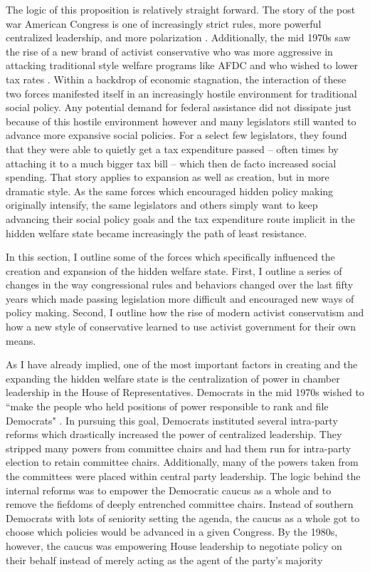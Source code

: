 \documentclass[12pt]{article}
\begin{document}
The logic of this proposition is relatively straight forward. The story of the post war American Congress is one of increasingly strict rules, more powerful centralized leadership, and more polarization \citep{rohde1991, binder2003}. Additionally, the mid 1970s saw the rise of a new brand of activist conservative who was more aggressive in attacking traditional style welfare programs like AFDC and who wished to lower tax rates \citep{hacker2007}. Within a backdrop of economic stagnation, the interaction of these two forces manifested itself in an increasingly hostile environment for traditional social policy. Any potential demand for federal assistance did not dissipate just because of this hostile environment however and many legislators still wanted to advance more expansive social policies. For a select few legislators, they found that they were able to quietly get a tax expenditure passed -- often times by attaching it to a much bigger tax bill -- which then de facto increased social spending. That story applies to expansion as well as creation, but in more dramatic style. As the same forces which encouraged hidden policy making originally intensify, the same legislators and others simply want to keep advancing their social policy goals and the tax expenditure route implicit in the hidden welfare state became increasingly the path of least resistance. 

In this section, I outline some of the forces which specifically influenced the creation and expansion of the hidden welfare state. First, I outline a series of changes in the way congressional rules and behaviors changed over the last fifty years which made passing legislation more difficult and encouraged new ways of policy making. Second, I outline how the rise of modern activist conservatism and how a new style of conservative learned to use activist government for their own means.

As I have already implied, one of the most important factors in creating and the expanding the hidden welfare state is the centralization of power in chamber leadership in the House of Representatives. Democrats in the mid 1970s wished to ``make the people who held positions of power responsible to rank and file Democrats" \citep[pg. 26, quote spoken by Rep. Donald Fraser (D-MN)]{rohde1991}. In pursuing this goal, Democrats instituted several intra-party reforms which drastically increased the power of centralized leadership. They stripped many powers from committee chairs and had them run for intra-party election to retain committee chairs. Additionally, many of the powers taken from the committees were placed within central party leadership. The logic behind the internal reforms was to empower the Democratic caucus as a whole and to remove the fiefdoms of deeply entrenched committee chairs. Instead of southern Democrats with lots of seniority setting the agenda, the caucus as a whole got to choose which policies would be advanced in a given Congress. By the 1980s, however, the caucus was empowering House leadership to negotiate policy on their behalf instead of merely acting as the agent of the party's majority \citep{sinclair1983, palazzolo1992, sinclair1998}
\end{document}
